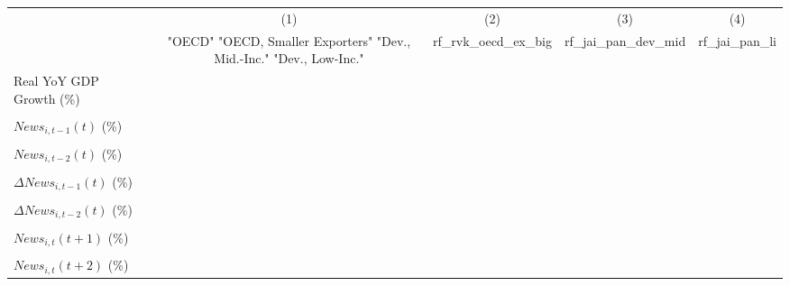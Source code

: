 {
\def\sym#1{\ifmmode^{#1}\else\(^{#1}\)\fi}
\begin{tabular}{l*{4}{c}}
\toprule
                    &\multicolumn{1}{c}{(1)}&\multicolumn{1}{c}{(2)}&\multicolumn{1}{c}{(3)}&\multicolumn{1}{c}{(4)}\\
                    &\multicolumn{1}{c}{ "OECD" "OECD, Smaller Exporters" "Dev., Mid.-Inc." "Dev., Low-Inc."}&\multicolumn{1}{c}{rf_rvk_oecd_ex_big}&\multicolumn{1}{c}{rf_jai_pan_dev_mid}&\multicolumn{1}{c}{rf_jai_pan_li}\\
\midrule
Real YoY GDP Growth (\%)&                     &                     &                     &                     \\
                    &                     &                     &                     &                     \\
\addlinespace
$ News_{i,t-1}(t)$ (\%)&                     &                     &                     &                     \\
                    &                     &                     &                     &                     \\
\addlinespace
$ News_{i,t-2}(t)$ (\%)&                     &                     &                     &                     \\
                    &                     &                     &                     &                     \\
\addlinespace
$ \Delta News_{i,t-1}(t)$ (\%)&                     &                     &                     &                     \\
                    &                     &                     &                     &                     \\
\addlinespace
$ \Delta News_{i,t-2}(t)$ (\%)&                     &                     &                     &                     \\
                    &                     &                     &                     &                     \\
\addlinespace
$ News_{i,t}(t+1)$ (\%)&                     &                     &                     &                     \\
                    &                     &                     &                     &                     \\
\addlinespace
$ News_{i,t}(t+2)$ (\%)&                     &                     &                     &                     \\

\end{tabular}}
